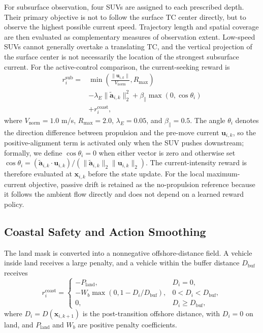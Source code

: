 \documentclass[a4paper,fleqn]{cas-dc}
\begin{document}
For subsurface observation, four SUVs are assigned to each prescribed depth.
Their primary objective is not to follow the surface TC center directly, but to
observe the highest possible current speed. Trajectory length and spatial
coverage are then evaluated as complementary measures of observation extent.
Low-speed SUVs cannot generally overtake a translating TC, and the vertical
projection of the surface center is not necessarily the location of the
strongest subsurface current. For the active-control comparison, the
current-seeking reward is
\begin{equation}
\begin{aligned}
r_i^{\mathrm{sub}}={}&
\min\left(
\frac{\|\mathbf{u}_{i,k}\|}{V_{\mathrm{norm}}},
R_{\max}
\right)\\
&-\lambda_E\|\tilde{\mathbf{a}}_{i,k}\|_2^2
+\beta_{\parallel}\max(0,\cos\theta_i)\\
&+r_i^{\mathrm{coast}},
\end{aligned}
\label{eq:sub_reward}
\end{equation}
where $V_{\mathrm{norm}}=1.0$ m/s, $R_{\max}=2.0$,
$\lambda_E=0.05$, and $\beta_{\parallel}=0.5$. The angle $\theta_i$ denotes
the direction difference between propulsion and the pre-move current
$\mathbf{u}_{i,k}$, so the positive-alignment term is activated only when the
SUV pushes downstream; formally, we define \(\cos\theta_i=0\) when either
vector is zero and otherwise set
$\cos\theta_i=
(\tilde{\mathbf{a}}_{i,k}\cdot\mathbf{u}_{i,k})/
(\|\tilde{\mathbf{a}}_{i,k}\|_2\|\mathbf{u}_{i,k}\|_2)$.
The current-intensity reward is therefore
evaluated at $\mathbf{x}_{i,k}$ before the state update.
For the local maximum-current objective, passive drift is retained as the
no-propulsion reference because it follows the ambient flow directly and does
not depend on a learned reward policy.

\subsection{Coastal Safety and Action Smoothing}

The land mask is converted into a nonnegative offshore-distance field. A vehicle
inside land receives a large penalty, and a vehicle within the buffer distance
$D_{\mathrm{buf}}$ receives
\begin{equation}
r_i^{\mathrm{coast}}=
\begin{cases}
-P_{\mathrm{land}}, & D_i=0,\\
-W_b\max(0,1-D_i/D_{\mathrm{buf}}), & 0<D_i<D_{\mathrm{buf}},\\
0, & D_i\geq D_{\mathrm{buf}},
\end{cases}
\label{eq:coast}
\end{equation}
where $D_i=D(\mathbf{x}_{i,k+1})$ is the post-transition offshore distance,
with $D_i=0$ on land, and $P_{\mathrm{land}}$ and $W_b$ are positive penalty
coefficients.
\end{document}
